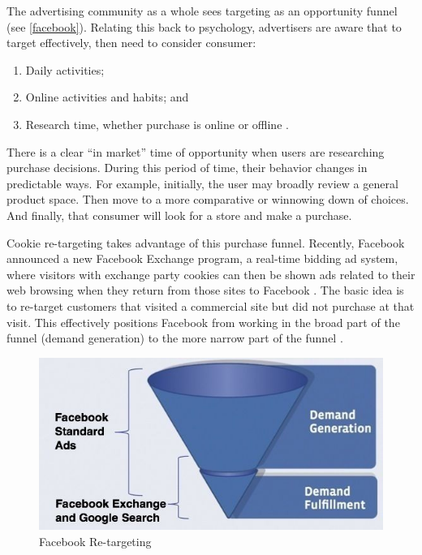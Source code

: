 The advertising community as a whole sees targeting as an opportunity funnel (see  \autoref{facebook}).  Relating this back to psychology, advertisers are aware that to target effectively, then need to consider consumer:

\begin{enumerate}
\item Daily activities;
\item Online activities and habits; and
\item Research time, whether purchase is online or offline \citep{Anonymous:2010uw}.
\label{opportunity}
\end{enumerate}


There is a clear ``in market'' time of opportunity when users are researching purchase decisions. During this period of time, their behavior changes in predictable ways. For example, initially, the user may broadly review a general product space. Then move to a more comparative or winnowing down of choices. And finally, that consumer will look for a store and make a purchase.

Cookie re-targeting takes advantage of this purchase funnel. Recently, Facebook announced a new Facebook Exchange program, a real-time bidding ad system, where visitors with exchange party cookies can then be shown ads related to their web browsing when they return from those sites to Facebook  \citep{Constine:ut}.  The basic idea is to re-target customers that visited a commercial site but did not purchase at that visit. This effectively positions Facebook from working in the broad part of the funnel (demand generation) to the more narrow part of the funnel  \citep[demand fulfillment;][]{Constine:ut}. 


\begin{figure}
\centerline{
  \includegraphics[scale=.75]{chapter2.tex/Image4}
  }
\caption{Facebook Re-targeting \citep[Image credit:][]{Constine:ut}}
\label{facebook}
\end{figure}


